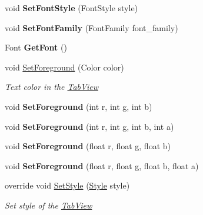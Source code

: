 \begin{DoxyCompactItemize}
void {\bfseries Set\+Font\+Style} (Font\+Style style)
\item 
\mbox{\label{class_space_v_i_l_1_1_tab_view_af8eb5cd9da3f6f7bed2094634893b8b2}} 
void {\bfseries Set\+Font\+Family} (Font\+Family font\+\_\+family)
\item 
\mbox{\label{class_space_v_i_l_1_1_tab_view_ae80a0f1fd1f47ad736712d5fb9578718}} 
Font {\bfseries Get\+Font} ()
\item 
void \mbox{\hyperlink{class_space_v_i_l_1_1_tab_view_a7a25297eecbcf09382c2752cd92d1244}{Set\+Foreground}} (Color color)
\begin{DoxyCompactList}\small\item\em Text color in the \mbox{\hyperlink{class_space_v_i_l_1_1_tab_view}{Tab\+View}} \end{DoxyCompactList}\item 
\mbox{\label{class_space_v_i_l_1_1_tab_view_a3e81b2cf9db21ac1c8a867391017fdca}} 
void {\bfseries Set\+Foreground} (int r, int g, int b)
\item 
\mbox{\label{class_space_v_i_l_1_1_tab_view_ae9f11aee9f6bf28788f7beadcf6ce6ad}} 
void {\bfseries Set\+Foreground} (int r, int g, int b, int a)
\item 
\mbox{\label{class_space_v_i_l_1_1_tab_view_ae018987f10e86c784e8434aeabce97ad}} 
void {\bfseries Set\+Foreground} (float r, float g, float b)
\item 
\mbox{\label{class_space_v_i_l_1_1_tab_view_a16a4832beb15a247519bc08be744583e}} 
void {\bfseries Set\+Foreground} (float r, float g, float b, float a)
\item 
override void \mbox{\hyperlink{class_space_v_i_l_1_1_tab_view_a02e2484cd3a31eb4d794a138981e3fa7}{Set\+Style}} (\mbox{\hyperlink{class_space_v_i_l_1_1_decorations_1_1_style}{Style}} style)
\begin{DoxyCompactList}\small\item\em Set style of the \mbox{\hyperlink{class_space_v_i_l_1_1_tab_view}{Tab\+View}} \end{DoxyCompactList}\end{DoxyCompactItemize}
